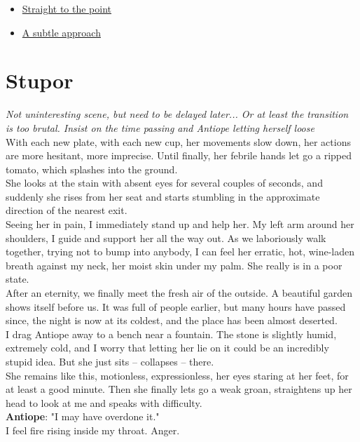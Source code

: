 \documentclass{report}
\newcommand{\dcomment}[1]{
	\emph{#1}
	\\
}
\newcommand{\speaker}[1]{
	\textbf{#1}: 
}
\newcommand{\glink}[2]{
	\hyperref[#1]{#2}
}
\newcommand{\gsection}[1]{
	\section*{#1}
	\label{#1}
}
\begin{document}
\begin{itemize}
	\item \glink{Blunt}{Straight to the point}
	\item \glink{Backstory}{A subtle approach}
\end{itemize}

\gsection{Stupor}

\dcomment{
	Not uninteresting scene, but need to be delayed later... Or at least the transition is too brutal. Insist on the time passing and Antiope letting herself loose
}

With each new plate, with each new cup, her movements slow down, her actions are more hesitant, more imprecise. Until finally, her febrile hands let go a ripped tomato, which splashes into the ground.\\

She looks at the stain with absent eyes for several couples of seconds, and suddenly she rises from her seat and starts stumbling in the approximate direction of the nearest exit.\\

Seeing her in pain, I immediately stand up and help her. My left arm around her shoulders, I guide and support her all the way out. As we laboriously walk together, trying not to bump into anybody, I can feel her erratic, hot, wine-laden breath against my neck, her moist skin under my palm. She really is in a poor state.\\

After an eternity, we finally meet the fresh air of the outside. A beautiful garden shows itself before us. It was full of people earlier, but many hours have passed since, the night is now at its coldest, and the place has been almost deserted.\\

I drag Antiope away to a bench near a fountain. The stone is slightly humid, extremely cold, and I worry that letting her lie on it could be an incredibly stupid idea. But she just sits – collapses – there.\\

She remains like this, motionless, expressionless, her eyes staring at her feet, for at least a good minute. Then she finally lets go a weak groan, straightens up her head to look at me and speaks with difficulty.\\

\speaker{Antiope} "I may have overdone it."\\

I feel fire rising inside my throat. Anger.\\
\end{document}
